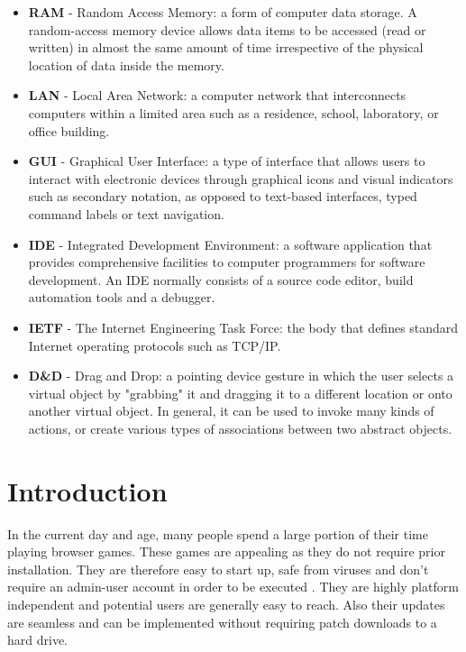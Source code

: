 \documentclass[bsc, 12pt, twoside, singlespacing, parskip, abbrevs, notimes, normalheadings, logo]{styles/infthesis}
\begin{document}
\begin{itemize}
\item \textbf{RAM} - Random Access Memory: a form of computer data storage. A random-access memory device allows data items to be accessed (read or written) in almost the same amount of time irrespective of the physical location of data inside the memory.\\
\item \textbf{LAN} - Local Area Network: a computer network that interconnects computers within a limited area such as a residence, school, laboratory, or office building.
\item \textbf{GUI} - Graphical User Interface: a type of interface that allows users to interact with electronic devices through graphical icons and visual indicators such as secondary notation, as opposed to text-based interfaces, typed command labels or text navigation. 
\item \textbf{IDE} - Integrated Development Environment: a software application that provides comprehensive facilities to computer programmers for software development. An IDE normally consists of a source code editor, build automation tools and a debugger.
\item \textbf{IETF} - The Internet Engineering Task Force: the body that defines standard Internet operating protocols such as TCP/IP. 
\item \textbf{D\&D} - Drag and Drop: a pointing device gesture in which the user selects a virtual object by "grabbing" it and dragging it to a different location or onto another virtual object. In general, it can be used to invoke many kinds of actions, or create various types of associations between two abstract objects.
\end{itemize}

\tableofcontents




\chapter{Introduction}
In the current day and age, many people spend a large portion of their time playing browser games. These games are appealing as they do not require prior installation. They are therefore easy to start up, safe from viruses and don't require an admin-user account in order to be executed \cite{Web_Apps_Superior}. They are highly platform independent and potential users are generally easy to reach. Also their updates are seamless and can be implemented without requiring patch downloads to a hard drive.
\end{document}
